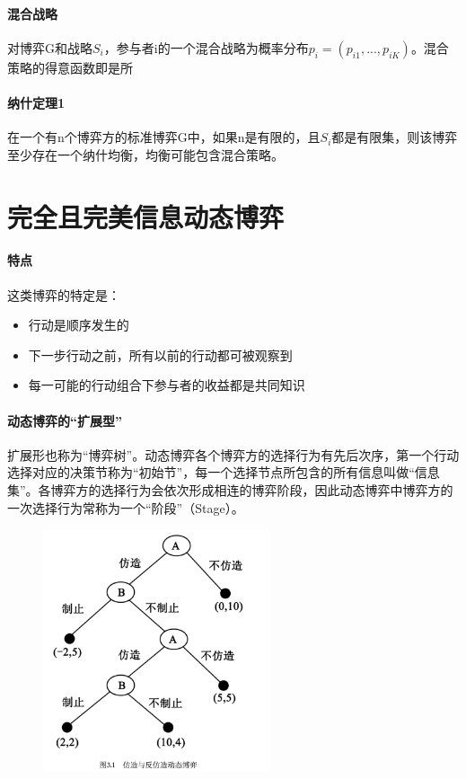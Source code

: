 \documentclass[12pt,a4paper]{article}
\begin{document}
\paragraph{混合战略} 对博弈G和战略$S_i$，参与者i的一个混合战略为概率分布$p_i=(p_{i1},...,p_{iK})$。混合策略的得意函数即是所
\paragraph{纳什定理1} 在一个有n个博弈方的标准博弈G中，如果n是有限的，且$S_i$都是有限集，则该博弈至少存在一个纳什均衡，均衡可能包含混合策略。



\section{完全且完美信息动态博弈}
\paragraph{特点} 这类博弈的特定是：
\begin{itemize}
	\item 行动是顺序发生的
	\item 下一步行动之前，所有以前的行动都可被观察到
	\item 每一可能的行动组合下参与者的收益都是共同知识
\end{itemize}
\paragraph{动态博弈的“扩展型”} 扩展形也称为“博弈树”。动态博弈各个博弈方的选择行为有先后次序，第一个行动选择对应的决策节称为“初始节”，每一个选择节点所包含的所有信息叫做“信息集”。各博弈方的选择行为会依次形成相连的博弈阶段，因此动态博弈中博弈方的一次选择行为常称为一个“阶段”（Stage）。
\begin{figure}[H]
	\centering
	\includegraphics[width=0.6\textwidth]{../images/game-theory-ext-form.png}
	\caption{}
	\label{}
\end{figure}
\end{document}
